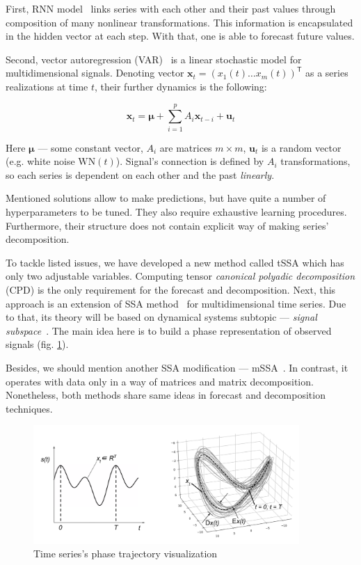 \documentclass[referee, pdflatex]{sn-jnl}
\theoremstyle{definition}
\theoremstyle{plain}
\begin{document}
	First, RNN model~\cite{neco, TEALAB2018334} links series with each other and their past values through composition of many nonlinear transformations. This information is encapsulated in the hidden vector at each step. With that, one is able to forecast future values.
	
	Second, vector autoregression (VAR)~\cite{VAR_model1, doi:10.1080/01621459.1962.10480664} is a linear stochastic model for multidimensional signals. Denoting vector $ \mathbf{x}_t = (x_1(t) \ldots x_m(t))^{\mathsf{T}} $ as a series realizations at time $ t $, their further dynamics is the following:
	
	\begin{equation*}
		\mathbf{x}_t = \boldsymbol{\mu} + \sum\limits_{i = 1}^p A_i \mathbf{x}_{t - i} + \mathbf{u}_t
	\end{equation*}
	
	Here  $ \boldsymbol{\mu} $ --- some constant vector, $ A_i $ are matrices $ m \times m $, $ \mathbf{u}_t $ is a random vector (e.g. white noise $ \text{WN}(t) $). Signal's connection is defined by $ A_i $ transformations, so each series is dependent on each other and the past \textit{linearly}.
	
	Mentioned solutions allow to make predictions, but have quite a number of hyperparameters to be tuned. They also require exhaustive learning procedures. Furthermore, their structure does not contain explicit way of making series' decomposition.
	
	To tackle listed issues, we have developed a new method called tSSA which has only two adjustable variables. Computing tensor \emph{canonical polyadic decomposition} (CPD) is the only requirement for the forecast and decomposition. Next, this approach is an extension of SSA method~\cite{ecfb9dc578be43ae9ee8fc88b8ff9151} for multidimensional time series. Due to that, its theory will be based on dynamical systems subtopic --- \textit{signal subspace}~\cite{1572261550523548160, ignatov2016human}. The main idea here is to build a phase representation of observed signals (fig. \ref{pic:phase_traj}).
	
	Besides, we should mention another SSA modification --- mSSA~\cite{mSSA_overview}. In contrast, it operates with data only in a way of matrices and matrix decomposition. Nonetheless, both methods share same ideas in forecast and decomposition techniques.
	
	\begin{figure}[h]
		\centering
		\includegraphics[width=0.9\textwidth, keepaspectratio]{../../figs/phase_traj.png}
		\caption{Time series's phase trajectory visualization }\label{pic:phase_traj}
	\end{figure}
	
\end{document}
